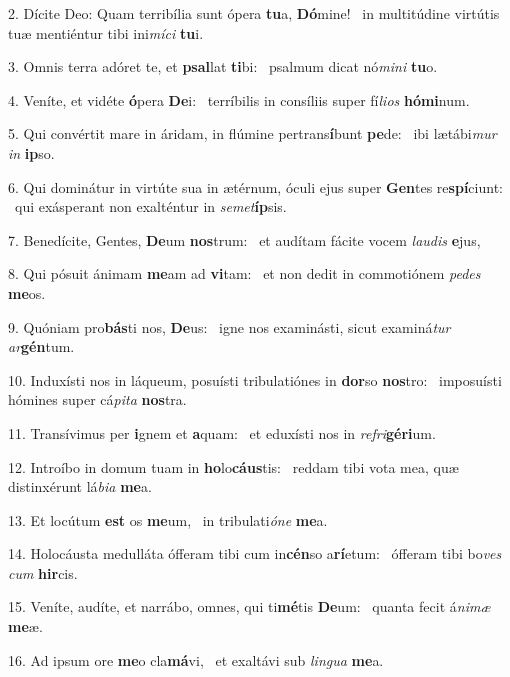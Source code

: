 2. Dícite Deo: Quam terribília sunt ópera \textbf{tu}a, \textbf{Dó}mine! \ast\  in multitúdine virtútis tuæ mentiéntur tibi ini\textit{mí}\textit{ci} \textbf{tu}i.\

3. Omnis terra adóret te, et \textbf{psal}lat \textbf{ti}bi: \ast\  psalmum dicat nó\textit{mi}\textit{ni} \textbf{tu}o.\

4. Veníte, et vidéte \textbf{ó}pera \textbf{De}i: \ast\  terríbilis in consíliis super fí\textit{li}\textit{os} \textbf{hó}\textbf{mi}num.\

5. Qui convértit mare in áridam, in flúmine pertrans\textbf{í}bunt \textbf{pe}de: \ast\  ibi lætábi\textit{mur} \textit{in} \textbf{ip}so.\

6. Qui dominátur in virtúte sua in ætérnum, óculi ejus super \textbf{Gen}tes re\textbf{spí}ciunt: \ast\  qui exásperant non exalténtur in \textit{se}\textit{met}\textbf{íp}sis.\

7. Benedícite, Gentes, \textbf{De}um \textbf{nos}trum: \ast\  et audítam fácite vocem \textit{lau}\textit{dis} \textbf{e}jus,\

8. Qui pósuit ánimam \textbf{me}am ad \textbf{vi}tam: \ast\  et non dedit in commotiónem \textit{pe}\textit{des} \textbf{me}os.\

9. Quóniam pro\textbf{bás}ti nos, \textbf{De}us: \ast\  igne nos examinásti, sicut examiná\textit{tur} \textit{ar}\textbf{gén}tum.\

10. Induxísti nos in láqueum, posuísti tribulatiónes in \textbf{dor}so \textbf{nos}tro: \ast\  imposuísti hómines super cá\textit{pi}\textit{ta} \textbf{nos}tra.\

11. Transívimus per \textbf{i}gnem et \textbf{a}quam: \ast\  et eduxísti nos in \textit{re}\textit{fri}\textbf{gé}\textbf{ri}um.\

12. Introíbo in domum tuam in \textbf{ho}lo\textbf{cáus}tis: \ast\  reddam tibi vota mea, quæ distinxérunt lá\textit{bi}\textit{a} \textbf{me}a.\

13. Et locútum \textbf{est} os \textbf{me}um, \ast\  in tribulati\textit{ó}\textit{ne} \textbf{me}a.\

14. Holocáusta medulláta ófferam tibi cum in\textbf{cén}so a\textbf{rí}etum: \ast\  ófferam tibi bo\textit{ves} \textit{cum} \textbf{hir}cis.\

15. Veníte, audíte, et narrábo, omnes, qui ti\textbf{mé}tis \textbf{De}um: \ast\  quanta fecit á\textit{ni}\textit{mæ} \textbf{me}æ.\

16. Ad ipsum ore \textbf{me}o cla\textbf{má}vi, \ast\  et exaltávi sub \textit{lin}\textit{gua} \textbf{me}a.\

